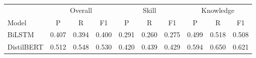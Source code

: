 \begin{tabular}{l ccc ccc ccc}
\hline
 & \multicolumn{3}{c}{Overall} & \multicolumn{3}{c}{Skill} & \multicolumn{3}{c}{Knowledge} \\
Model & P & R & F1 & P & R & F1 & P & R & F1 \\
\hline
BiLSTM & 0.407 & 0.394 & 0.400 & 0.291 & 0.260 & 0.275 & 0.499 & 0.518 & 0.508 \\
DistilBERT & 0.512 & 0.548 & 0.530 & 0.420 & 0.439 & 0.429 & 0.594 & 0.650 & 0.621 \\
\hline
\end{tabular}
